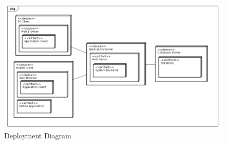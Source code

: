 \begin{figure}[h]
\centering\includegraphics[width=\textwidth]{Images/UMLDiagrams/DeploymentDiagram.png}
\caption{Deployment Diagram}
\end{figure}
